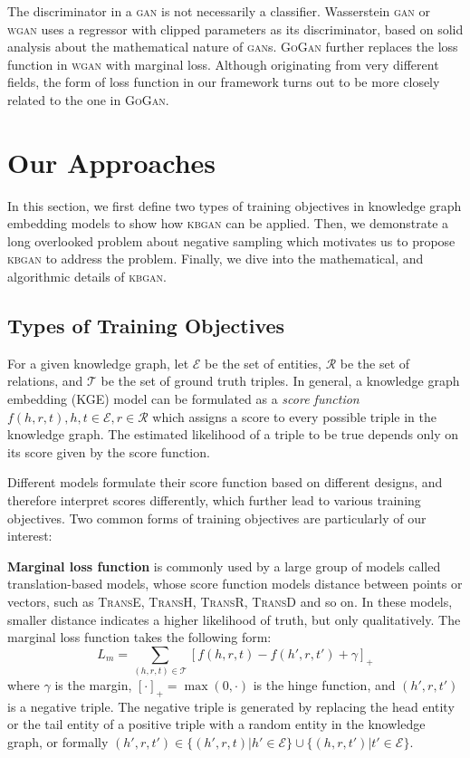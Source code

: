 \documentclass[11pt,a4paper]{article}
\begin{document}
The discriminator in a \textsc{gan} is not necessarily a classifier. Wasserstein \textsc{gan} or \textsc{wgan} \cite{wgan} uses a regressor with clipped parameters as its discriminator, based on solid analysis about the mathematical nature of \textsc{gan}s. \textsc{GoGan} \cite{gogan} further replaces the loss function in \textsc{wgan} with marginal loss. Although originating from very different fields, the form of loss function in our framework turns out to be more closely related to the one in \textsc{GoGan}.

\section{Our Approaches}
In this section, we first define two types of training objectives in knowledge graph embedding models to show how \textsc{kbgan} can be applied. Then, we demonstrate a long overlooked problem about negative sampling which motivates us to propose \textsc{kbgan} to address the problem. Finally, we dive into the mathematical, and algorithmic details of \textsc{kbgan}.

\subsection{Types of Training Objectives}
For a given knowledge graph, let $\mathcal{E}$ be the set of entities, $\mathcal{R}$ be the set of relations, and $\mathcal{T}$ be the set of ground truth triples.
In general, a knowledge graph embedding (KGE) model can be formulated as a \emph{score function} $f(h,r,t), h,t\in\mathcal{E}, r\in \mathcal{R}$ which assigns a score to every possible triple in the knowledge graph. The estimated likelihood of a triple to be true depends only on its score given by the score function.

Different models formulate their score function based on different designs, and therefore interpret scores differently, which further lead to various training objectives. Two common forms of training objectives are particularly of our interest:

\noindent \textbf{Marginal loss function} is commonly used by a large group of models called translation-based models, whose score function models distance between points or vectors, such as \textsc{TransE}, \textsc{TransH}, \textsc{TransR}, \textsc{TransD} and so on. In these models, smaller distance indicates a higher likelihood of truth, but only qualitatively.
The marginal loss function takes the following form:
\begin{equation}
L_{m}=\sum_{(h,r,t)\in\mathcal{T}}[f(h,r,t)-f(h',r,t')+\gamma]_+\label{eq:marginalloss}
\end{equation}
where $\gamma$ is the margin, $[\cdot]_+=\max(0,\cdot)$ is the hinge function, and $(h',r,t')$ is a negative triple. The negative triple is generated by replacing the head entity or the tail entity of a positive triple with a random entity in the knowledge graph, or formally $(h',r,t')\in\{(h',r,t)|h'\in\mathcal{E}\}\cup\{(h,r,t')|t'\in\mathcal{E}\}$.
\end{document}

